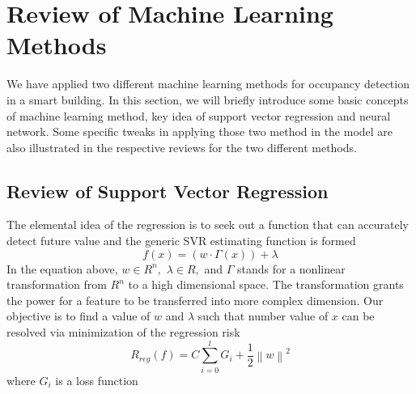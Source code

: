 \section{Review of Machine Learning Methods}
We have applied two different machine learning methods for occupancy detection in a smart building. In this section, we will briefly introduce some basic concepts of machine learning method, key idea of support vector regression and neural network. Some specific tweaks in applying those two method in the model are also illustrated in the respective reviews for the two different methods.
\subsection{Review of Support Vector Regression}

The elemental idea of the regression is to seek out a function that can accurately detect future value and the generic SVR estimating function is formed
\[
f\left( x \right) = \left( {w \cdot \Gamma \left( x \right)} \right) + \lambda
\label{eq:1}
\]
In the equation above, $w \in {R^n},$ $\lambda \in {R},$ and $\Gamma$ stands for a nonlinear transformation from $R^n$ to a high dimensional space. The transformation grants the power for a feature to be transferred into more complex dimension. Our objective is to find a value of $w$ and $\lambda$ such that number value of $x$ can be resolved via minimization of the regression risk
\[
{R_{reg}}\left( f \right) = C\sum\limits_{i = 0}^l {{G _i} + \frac{1}{2}{{\left\| w \right\|}^2}}
\label{eq:2}
\]
where ${G _i}$ is a loss function
